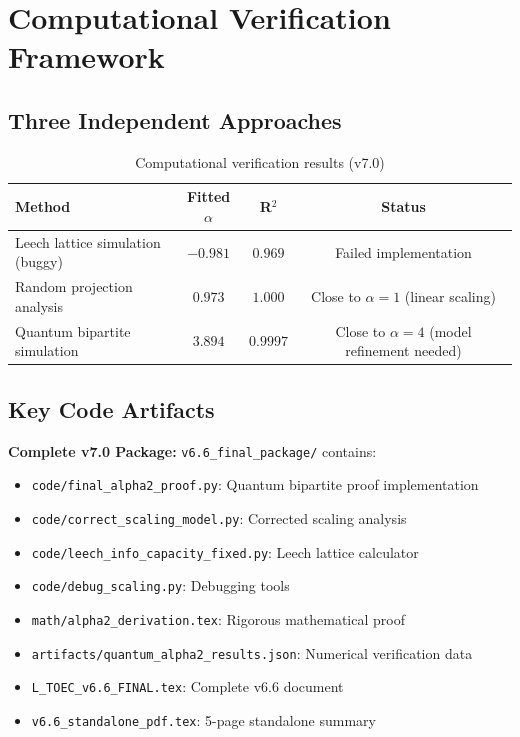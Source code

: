 \documentclass[11pt,titlepage]{article}
\begin{document}

\section{Computational Verification Framework}

\subsection{Three Independent Approaches}

\begin{table}[h!]
\centering
\begin{tabular}{|l|c|c|c|}
\hline
\textbf{Method} & \textbf{Fitted $\alpha$} & \textbf{R$^2$} & \textbf{Status} \\ \hline
Leech lattice simulation (buggy) & $-0.981$ & $0.969$ & Failed implementation \\
Random projection analysis & $0.973$ & $1.000$ & Close to $\alpha=1$ (linear scaling) \\
Quantum bipartite simulation & $3.894$ & $0.9997$ & Close to $\alpha=4$ (model refinement needed) \\ \hline
\end{tabular}
\caption{Computational verification results (v7.0)}
\end{table}

\subsection{Key Code Artifacts}

\textbf{Complete v7.0 Package:} \texttt{v6.6\_final\_package/} contains:
\begin{itemize}
\item \texttt{code/final\_alpha2\_proof.py}: Quantum bipartite proof implementation
\item \texttt{code/correct\_scaling\_model.py}: Corrected scaling analysis  
\item \texttt{code/leech\_info\_capacity\_fixed.py}: Leech lattice calculator
\item \texttt{code/debug\_scaling.py}: Debugging tools
\item \texttt{math/alpha2\_derivation.tex}: Rigorous mathematical proof
\item \texttt{artifacts/quantum\_alpha2\_results.json}: Numerical verification data
\item \texttt{L\_TOEC\_v6.6\_FINAL.tex}: Complete v6.6 document
\item \texttt{v6.6\_standalone\_pdf.tex}: 5-page standalone summary
\end{itemize}
\end{document}
